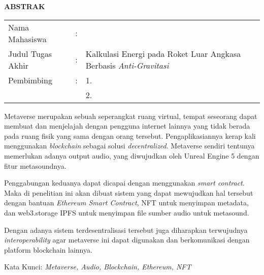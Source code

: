 \begin{center}
  \large\textbf{ABSTRAK}
\end{center}


\vspace{2ex}

\begingroup
\setlength{\tabcolsep}{0pt}

\noindent
\begin{tabularx}{\textwidth}{l >{\centering}m{2em} X}
  Nama Mahasiswa    & : & \name{}                                                                 \\

  Judul Tugas Akhir & : & Kalkulasi Energi pada Roket Luar Angkasa Berbasis \emph{Anti-Gravitasi} \\

  Pembimbing        & : & 1. \advisor{}                                                           \\
                    &   & 2. \coadvisor{}                                                         \\
\end{tabularx}
\endgroup

Metaverse merupakan sebuah seperangkat ruang virtual, tempat seseorang dapat membuat dan menjelajah
dengan pengguna internet lainnya yang tidak berada pada ruang fisik yang sama dengan orang tersebut.
Pengaplikasiannya kerap kali menggunakan \emph{blockchain} sebagai solusi \emph{decentralized}. Metaverse sendiri
tentunya memerlukan adanya output audio, yang diwujudkan oleh Unreal Engine 5 dengan fitur metasoundnya.

Penggabungan keduanya dapat dicapai dengan menggunakan \emph{smart contract}. Maka di penelitian ini akan dibuat sistem yang dapat mewujudkan hal tersebut
dengan bantuan \emph{Ethereum Smart Contract}, NFT untuk menyimpan metadata, dan web3.storage IPFS untuk menyimpan file sumber audio untuk metasound.

Dengan adanya sistem terdesentralisasi tersebut juga diharapkan terwujudnya \emph{interoperability} agar metaverse ini dapat digunakan dan berkomunikasi dengan platform
blockchain lainnya.

Kata Kunci: \emph{Metaverse, Audio, Blockchain, Ethereum, NFT}
